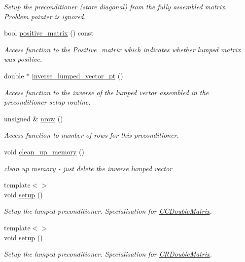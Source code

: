 \begin{DoxyCompactItemize}
\begin{DoxyCompactList}\small\item\em Setup the preconditioner (store diagonal) from the fully assembled matrix. \hyperlink{classoomph_1_1Problem}{Problem} pointer is ignored. \end{DoxyCompactList}\item 
bool \hyperlink{classoomph_1_1MatrixBasedLumpedPreconditioner_a43eed9c6a5622d62b2261e83c01d04ec}{positive\+\_\+matrix} () const
\begin{DoxyCompactList}\small\item\em Access function to the Positive\+\_\+matrix which indicates whether lumped matrix was positive. \end{DoxyCompactList}\item 
double $\ast$ \hyperlink{classoomph_1_1MatrixBasedLumpedPreconditioner_abbfef1f645630a06b5824b0cc69aa3e5}{inverse\+\_\+lumped\+\_\+vector\+\_\+pt} ()
\begin{DoxyCompactList}\small\item\em Access function to the inverse of the lumped vector assembled in the preconditioner setup routine. \end{DoxyCompactList}\item 
unsigned \& \hyperlink{classoomph_1_1MatrixBasedLumpedPreconditioner_ad165843e92c2aac0367afd9bb0ce29b0}{nrow} ()
\begin{DoxyCompactList}\small\item\em Access function to number of rows for this preconditioner. \end{DoxyCompactList}\item 
void \hyperlink{classoomph_1_1MatrixBasedLumpedPreconditioner_a17703845dc37066eb6851e12b1f182cb}{clean\+\_\+up\+\_\+memory} ()
\begin{DoxyCompactList}\small\item\em clean up memory -\/ just delete the inverse lumped vector \end{DoxyCompactList}\item 
{\footnotesize template$<$$>$ }\\void \hyperlink{classoomph_1_1MatrixBasedLumpedPreconditioner_ae8fe580054f7939179514762c6bf7bc2}{setup} ()
\begin{DoxyCompactList}\small\item\em Setup the lumped preconditioner. Specialisation for \hyperlink{classoomph_1_1CCDoubleMatrix}{C\+C\+Double\+Matrix}. \end{DoxyCompactList}\item 
{\footnotesize template$<$$>$ }\\void \hyperlink{classoomph_1_1MatrixBasedLumpedPreconditioner_a05f9fa9aa3ed50ab59b066575a4ff919}{setup} ()
\begin{DoxyCompactList}\small\item\em Setup the lumped preconditioner. Specialisation for \hyperlink{classoomph_1_1CRDoubleMatrix}{C\+R\+Double\+Matrix}. \end{DoxyCompactList}\end{DoxyCompactItemize}
